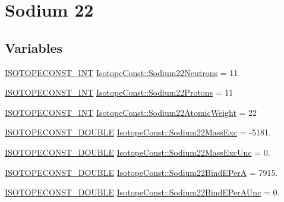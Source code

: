 \hypertarget{group___isotope_const-_sodium-_na22}{}\section{Sodium 22}
\label{group___isotope_const-_sodium-_na22}
\subsection*{Variables}
\begin{DoxyCompactItemize}
\item 
\mbox{\hyperlink{group___isotope_const-_macros_ga5f18360b3e99483a35c32d789e62621c}{I\+S\+O\+T\+O\+P\+E\+C\+O\+N\+S\+T\+\_\+\+I\+NT}} \mbox{\hyperlink{group___isotope_const-_sodium-_na22_gaf612ac607ae1994d98a7df074ae18eb5}{Isotope\+Const\+::\+Sodium22\+Neutrons}} = 11
\item 
\mbox{\hyperlink{group___isotope_const-_macros_ga5f18360b3e99483a35c32d789e62621c}{I\+S\+O\+T\+O\+P\+E\+C\+O\+N\+S\+T\+\_\+\+I\+NT}} \mbox{\hyperlink{group___isotope_const-_sodium-_na22_gab93e7192cd8d5cf84e42be4a84897b66}{Isotope\+Const\+::\+Sodium22\+Protons}} = 11
\item 
\mbox{\hyperlink{group___isotope_const-_macros_ga5f18360b3e99483a35c32d789e62621c}{I\+S\+O\+T\+O\+P\+E\+C\+O\+N\+S\+T\+\_\+\+I\+NT}} \mbox{\hyperlink{group___isotope_const-_sodium-_na22_gadc061e8f0d3c6fb296264e4ad07f08c6}{Isotope\+Const\+::\+Sodium22\+Atomic\+Weight}} = 22
\item 
\mbox{\hyperlink{group___isotope_const-_macros_ga8f45a7272ce02c0b4c65c44636ed719a}{I\+S\+O\+T\+O\+P\+E\+C\+O\+N\+S\+T\+\_\+\+D\+O\+U\+B\+LE}} \mbox{\hyperlink{group___isotope_const-_sodium-_na22_ga08e6650c544d8245a89c983c2c97971b}{Isotope\+Const\+::\+Sodium22\+Mass\+Exc}} = -\/5181.
\item 
\mbox{\hyperlink{group___isotope_const-_macros_ga8f45a7272ce02c0b4c65c44636ed719a}{I\+S\+O\+T\+O\+P\+E\+C\+O\+N\+S\+T\+\_\+\+D\+O\+U\+B\+LE}} \mbox{\hyperlink{group___isotope_const-_sodium-_na22_ga12b1ba99129529450a199d84c13e6c03}{Isotope\+Const\+::\+Sodium22\+Mass\+Exc\+Unc}} = 0.
\item 
\mbox{\hyperlink{group___isotope_const-_macros_ga8f45a7272ce02c0b4c65c44636ed719a}{I\+S\+O\+T\+O\+P\+E\+C\+O\+N\+S\+T\+\_\+\+D\+O\+U\+B\+LE}} \mbox{\hyperlink{group___isotope_const-_sodium-_na22_gafe006cf587d0be62e2ecd8d030cd3e4b}{Isotope\+Const\+::\+Sodium22\+Bind\+E\+PerA}} = 7915.
\item 
\mbox{\hyperlink{group___isotope_const-_macros_ga8f45a7272ce02c0b4c65c44636ed719a}{I\+S\+O\+T\+O\+P\+E\+C\+O\+N\+S\+T\+\_\+\+D\+O\+U\+B\+LE}} \mbox{\hyperlink{group___isotope_const-_sodium-_na22_gabba1ccc5ad1c52beb5494edb1c90187a}{Isotope\+Const\+::\+Sodium22\+Bind\+E\+Per\+A\+Unc}} = 0.

\end{DoxyCompactItemize}
